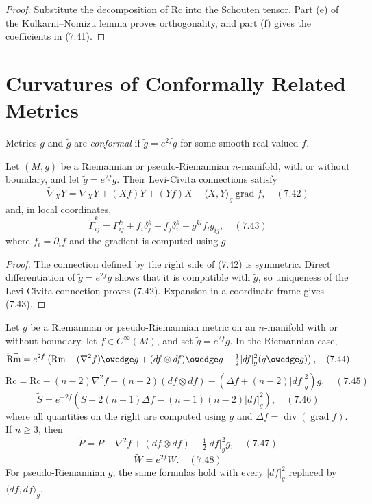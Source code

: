\begin{proof}
\sketch
Substitute the decomposition of $\mathrm{Rc}$ into the Schouten tensor.
Part (e) of the Kulkarni--Nomizu lemma proves orthogonality, and part (f)
gives the coefficients in (7.41).
\end{proof}

\section{Curvatures of Conformally Related Metrics}

Metrics $g$ and $\widetilde g$ are \emph{conformal} if
$\widetilde g=e^{2f}g$ for some smooth real-valued $f$.

\begin{proposition}
\label{prop:conformal-transformation-levi-civita}

Let $(M,g)$ be a Riemannian or pseudo-Riemannian $n$-manifold, with or without
boundary, and let $\widetilde g=e^{2f}g$.  Their Levi-Civita connections satisfy
\[
\widetilde\nabla_XY=\nabla_XY+(Xf)Y+(Yf)X
-\langle X,Y\rangle_g\operatorname{grad}f, \quad (7.42)
\]
and, in local coordinates,
\[
\widetilde\Gamma^k_{ij}=\Gamma^k_{ij}+f_i\delta^k_j+f_j\delta^k_i
-g^{kl}f_lg_{ij}, \quad (7.43)
\]
where $f_i=\partial_if$ and the gradient is computed using $g$.
\end{proposition}

\begin{proof}
\sketch
The connection defined by the right side of (7.42) is symmetric.  Direct
differentiation of $\widetilde g=e^{2f}g$ shows that it is compatible with
$\widetilde g$, so uniqueness of the Levi-Civita connection proves (7.42).
Expansion in a coordinate frame gives (7.43).
\end{proof}

\begin{theorem}
\label{thm:conformal-transformation-curvature}

Let $g$ be a Riemannian or pseudo-Riemannian metric on an $n$-manifold with or
without boundary, let $f\in C^\infty(M)$, and set $\widetilde g=e^{2f}g$.
In the Riemannian case,
\[
\widetilde{\mathrm{Rm}}=e^{2f}\left(\mathrm{Rm}-(\nabla^2f)\owedge g
+(df\otimes df)\owedge g-\tfrac12|df|_g^2(g\owedge g)\right), \quad (7.44)
\]
\[
\widetilde{\mathrm{Rc}}=\mathrm{Rc}-(n-2)\nabla^2f
+(n-2)(df\otimes df)-(\Delta f+(n-2)|df|_g^2)g, \quad (7.45)
\]
\[
\widetilde S=e^{-2f}\left(S-2(n-1)\Delta f
-(n-1)(n-2)|df|_g^2\right), \quad (7.46)
\]
where all quantities on the right are computed using $g$ and
$\Delta f=\operatorname{div}(\operatorname{grad}f)$.  If $n\geq3$, then
\[
\widetilde P=P-\nabla^2f+(df\otimes df)-\tfrac12|df|_g^2g, \quad (7.47)
\]
\[
\widetilde W=e^{2f}W. \quad (7.48)
\]
For pseudo-Riemannian $g$, the same formulas hold with every $|df|_g^2$
replaced by $\langle df,df\rangle_g$.
\end{theorem}

